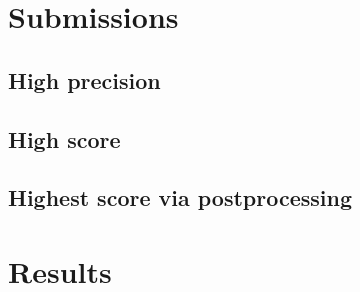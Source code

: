 \section{Submissions}
\subsection{High precision}
\subsection{High score}
\subsection{Highest score via postprocessing}
\section{Results}
